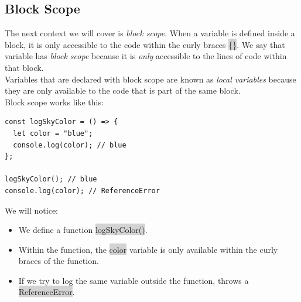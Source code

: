 \documentclass[11pt]{article}
\begin{document}
\subsection{Block Scope}
The next context we will cover is \textit{block scope}. When a variable is defined inside a block, it is only accessible to the code within the curly braces \colorbox{lightgray}{\{\}}. We say that variable has \textit{block scope} because it is \textit{only} accessible to the lines of code within that block. \\
\newline
Variables that are declared with block scope are known as \textit{local variables} because they are only available to the code that is part of the same block. \\
\newline
Block scope works like this:
\begin{lstlisting}
const logSkyColor = () => {
  let color = "blue"; 
  console.log(color); // blue 
};

logSkyColor(); // blue 
console.log(color); // ReferenceError
\end{lstlisting}
We will notice:
\begin{itemize}[leftmargin = *]
\item We define a function  \colorbox{lightgray}{logSkyColor()}.
\item Within the function, the  \colorbox{lightgray}{color} variable is only available within the curly braces of the function.
\item If we try to log the same variable outside the function, throws a  \colorbox{lightgray}{ReferenceError}.
\end{itemize}
\end{document}
